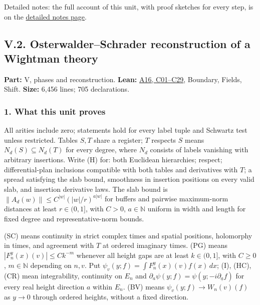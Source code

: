 \documentclass[
  letterpaper,
  11pt]{article}
\begin{document}
Detailed notes: the full account of this unit, with proof sketches for
every step, is on the
\href{https://github.com/scottnarmstrong/yang-mills-informalization/blob/main/outline/notes/V-1.md}{detailed
notes page}.

\subsection{V.2. Osterwalder--Schrader reconstruction of a Wightman
theory}\label{v.2.-osterwalderschrader-reconstruction-of-a-wightman-theory}

\textbf{Part:} V, phases and reconstruction. \textbf{Lean:}
\href{https://github.com/yang-mills-group/OpenAI-YM-20261028/tree/3456e5e75cf8d4cd558955a5c7638fba2d68f464/YM/Work}{A16,
C01--C29}, Boundary, Fields, Shift. \textbf{Size:} 6,456 lines; 705
declarations.

\subsubsection{1. What this unit proves}\label{what-this-unit-proves-21}

All arities include zero; statements hold for every label tuple and
Schwartz test unless restricted. Tables \(S,T\) share a register; \(T\)
respects \(S\) means \(N_d(S)\subseteq N_d(T)\) for every degree, where
\(N_d\) consists of labels vanishing with arbitrary insertions. Write
(H) for: both Euclidean hierarchies; respect; differential-plan
inclusions compatible with both tables and derivatives with \(T\); a
spread satisfying the slab bound, smoothness in insertion positions on
every valid slab, and insertion derivative laws. The slab bound is
\(\|A_d(w)\|\le C^{|w|}(|w|/r)^{a|w|}\) for buffers and pairwise
maximum-norm distances at least \(r\in(0,1]\), with \(C>0\),
\(a\in\mathbb N\) uniform in width and length for fixed degree and
representative-norm bounds.

(SC) means continuity in strict complex times and spatial positions,
holomorphy in times, and agreement with \(T\) at ordered imaginary
times. (PG) means \(|F_n^y(x)(v)|\le Ck^{-m}\) whenever all height gaps
are at least \(k\in(0,1]\), with \(C\ge0\), \(m\in\mathbb N\) depending
on \(n,v\). Put \(\psi_v(y;f)=\int F_n^y(x)(v)f(x)\,dx\); (I), (HC),
(CR) mean integrability, continuity on \(E_n\) and
\(\partial_a\psi(y;f)=\psi(y;-i\partial_{\underline a}f)\) for every
real height direction \(a\) within \(E_n\). (BV) means
\(\psi_v(y;f)\to W_n(v)(f)\) as \(y\to0\) through ordered heights,
without a fixed direction.
\end{document}
